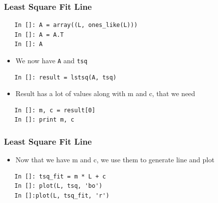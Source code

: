 \begin{frame}[fragile]
  \frametitle{Least Square Fit Line}
  \begin{lstlisting}
   In []: A = array((L, ones_like(L)))
   In []: A = A.T
   In []: A
  \end{lstlisting}
  \begin{itemize}
  \item We now have \texttt{A} and \texttt{tsq}
  \end{itemize}
  \begin{lstlisting}
   In []: result = lstsq(A, tsq)
  \end{lstlisting}
  \begin{itemize}
  \item Result has a lot of values along with m and c, that we need
  \end{itemize}
  \begin{lstlisting}
   In []: m, c = result[0]
   In []: print m, c
  \end{lstlisting}
\end{frame}



\begin{frame}[fragile]
  \frametitle{Least Square Fit Line}
  \begin{itemize}
  \item Now that we have m and c, we use them to generate line and plot
  \end{itemize}
  \begin{lstlisting}
   In []: tsq_fit = m * L + c
   In []: plot(L, tsq, 'bo')
   In []:plot(L, tsq_fit, 'r')
  \end{lstlisting}
\end{frame}

